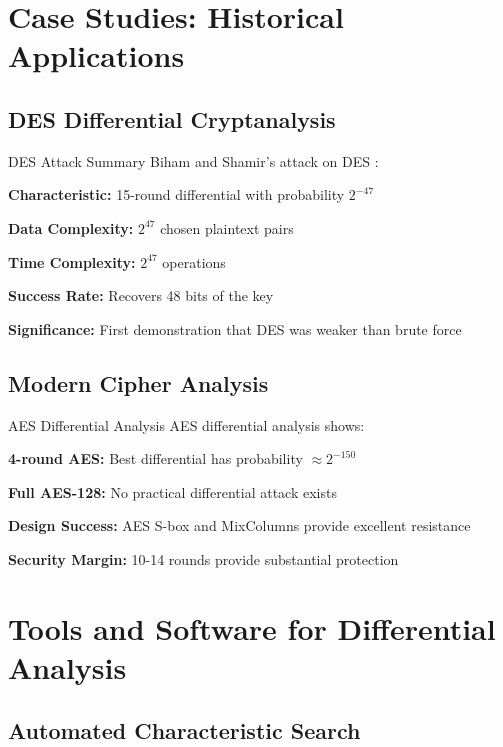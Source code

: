 \documentclass[12pt,a4paper]{article}
\theoremstyle{definition}
\begin{document}
\section{Case Studies: Historical Applications}

\subsection{DES Differential Cryptanalysis}

\begin{examplebox}{DES Attack Summary}
Biham and Shamir's attack on DES \cite{biham1993differential}:

\textbf{Characteristic:} 15-round differential with probability $2^{-47}$

\textbf{Data Complexity:} $2^{47}$ chosen plaintext pairs

\textbf{Time Complexity:} $2^{47}$ operations

\textbf{Success Rate:} Recovers 48 bits of the key

\textbf{Significance:} First demonstration that DES was weaker than brute force
\end{examplebox}

\subsection{Modern Cipher Analysis}

\begin{examplebox}{AES Differential Analysis}
AES differential analysis \cite{daemen2002design,nist2001aes} shows:

\textbf{4-round AES:} Best differential has probability $\approx 2^{-150}$

\textbf{Full AES-128:} No practical differential attack exists

\textbf{Design Success:} AES S-box and MixColumns provide excellent resistance

\textbf{Security Margin:} 10-14 rounds provide substantial protection
\end{examplebox}

\section{Tools and Software for Differential Analysis}

\subsection{Automated Characteristic Search}
\end{document}
